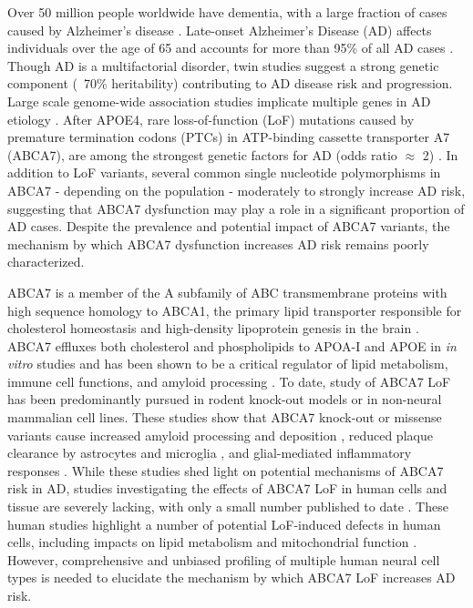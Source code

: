 Over 50 million people worldwide have dementia, with a large fraction of cases caused by Alzheimer’s disease \cite{WHO2023Dementia}. Late-onset Alzheimer’s Disease (AD) affects individuals over the age of 65 and accounts for more than 95\% of all AD cases \cite{Alzheimers_Association2016-jx}. Though AD is a multifactorial disorder, twin studies suggest a strong genetic component (~70\% heritability) \cite{Karlsson2022-vv} contributing to AD disease risk and progression. Large scale genome-wide association studies implicate multiple genes in AD etiology \cite{Lambert2013-km,Marioni2019-os,Jansen2019-ww,Kunkle2019-yo,Wightman2021-km,Bellenguez2022-ao,Belloy2023-kj}. After APOE4, rare loss-of-function (LoF) mutations caused by premature termination codons (PTCs) in ATP-binding cassette transporter A7 (ABCA7), are among the strongest genetic factors for AD (odds ratio $\approx$ 2) \cite{Steinberg2015-mu,De_Roeck2019-bs,Reitz2013-eo,Bellenguez2022-ao,Holstege2022-vp,Lyssenko2021-gw}. In addition to LoF variants, several common single nucleotide polymorphisms in ABCA7 - depending on the population - moderately \cite{Steinberg2015-mu,De_Roeck2019-bs,Reitz2013-eo,Bellenguez2022-ao,Le_Guennec2016-mr,Hollingworth2011-tr,Naj2011-bs} to strongly \cite{Reitz2013-eo} increase AD risk, suggesting that ABCA7 dysfunction may play a role in a significant proportion of AD cases. Despite the prevalence and potential impact of ABCA7 variants, the mechanism by which ABCA7 dysfunction increases AD risk remains poorly characterized. 

ABCA7 is a member of the A subfamily of ABC transmembrane proteins \cite{Kim2008-zi} with high sequence homology to ABCA1, the primary lipid transporter responsible for cholesterol homeostasis and high-density lipoprotein genesis in the brain \cite{Koldamova2014-kd}. ABCA7 effluxes both cholesterol and phospholipids to APOA-I and APOE in \textit{in vitro} studies \cite{Abe-Dohmae2004-wb,Wang2003-wh,Tomioka2017-nv,Picataggi2022-yp,Quazi2013-pe,Fang2025} and has been shown to be a critical regulator of lipid metabolism, immune cell functions, and amyloid processing \cite{Aikawa2018-ek,Tanaka2011-zo,Duchateau2023-ji,Kawatani2023-vf,Tayran2024-bo}. To date, study of ABCA7 LoF has been predominantly pursued in rodent knock-out models or in non-neural mammalian cell lines. These studies show that ABCA7 knock-out or missense variants  cause increased amyloid processing and deposition \cite{Satoh2015-yu,Sakae2016-uy,Chan2008-qu,Bamji-Mirza2018-xt}, reduced plaque clearance by astrocytes and microglia \cite{Kim2013-sv,Fu2016-qe}, and glial-mediated inflammatory responses \cite{Aikawa2019-hv,Aikawa2021-vz}.  While these studies shed light on potential mechanisms of ABCA7 risk in AD, studies investigating the effects of ABCA7 LoF in human cells and tissue are severely lacking, with only a small number published to date \cite{Kawatani2023-vf,Allen2017-vw,Liu2021-zh,Bamji-Mirza2018-xt}.  These human studies highlight a number of potential LoF-induced defects in human cells, including impacts on lipid metabolism and mitochondrial function \cite{Kawatani2023-vf}. However, comprehensive and unbiased profiling of multiple human neural cell types is needed to elucidate the mechanism by which ABCA7 LoF increases AD risk.

